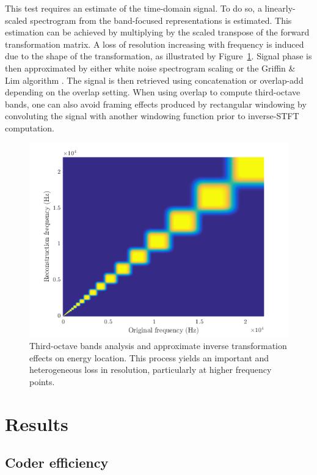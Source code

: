 \documentclass[final,3p,times,twocolumn]{elsarticle}
\begin{document}
This test requires an estimate of the time-domain signal. To do so, a linearly-scaled spectrogram from the band-focused representations is estimated. This estimation can be achieved by multiplying by the scaled transpose of the forward transformation matrix. A loss of resolution increasing with frequency is induced due to the shape of the transformation, as illustrated by Figure~\ref{fig:freq}. Signal phase is then approximated by either white noise spectrogram scaling or the Griffin \& Lim algorithm \cite{griffin1984}. The signal is then retrieved using concatenation or overlap-add depending on the overlap setting. When using overlap to compute third-octave bands, one can also avoid framing effects produced by rectangular windowing by convoluting the signal with another windowing function prior to inverse-STFT computation.

\begin{figure}[htbp]
	\centering
		\includegraphics[width=\columnwidth]{figures/freq.png}
	\caption{Third-octave bands analysis and approximate inverse transformation effects on energy location. This process yields an important and heterogeneous loss in resolution, particularly at higher frequency points.}
	\label{fig:freq}
\end{figure}



\section{Results} \label{sec:results}

\subsection{Coder efficiency}
\end{document}
